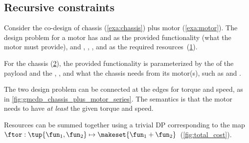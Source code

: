 \subsection{Recursive constraints}

\begin{example}
    \label{exa:chassis_plus_motor}
    Consider the co-design of chassis (\cref{exa:chassis}) plus motor (\cref{exa:motor}).
    The design problem for a motor has  and  as the provided functionality (what the motor must provide), and , , , and  as the required resources~(\cref{fig:motor}).

    \begin{figure}[h!]
        \centering
        \caption{}
        \label{fig:motor}
    \end{figure}

    For the chassis (\cref{fig:gmcdp_chassis}), the provided functionality is parameterized by the  of the payload and the , , and what the chassis needs from its motor(s), such as  and .

    \begin{figure}[h!]
        \centering
        \caption{}
        \label{fig:gmcdp_chassis}
    \end{figure}

    The two design problem can be connected at the edges for torque and speed, as in \cref{fig:gmcdp_chassis_plus_motor_series}.
    The semantics is that the motor needs to have \emph{at least} the given torque and speed.


    \begin{figure*}[h!]
        \centering
        \caption{}
        \label{fig:gmcdp_chassis_plus_motor_series}
    \end{figure*}

    Resources can be summed together using a trivial DP corresponding to the map $\ftor:\tup{\fun_{1},\fun_{2}} \mapsto\makeset{\fun_{1}+\fun_{2}}$~(\cref{fig:total_cost}).


\end{example}
